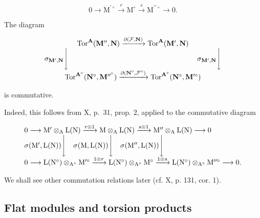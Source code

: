 \[
0 \rightarrow \mathrm{M} ^ {\prime \circ} \xrightarrow {r} \mathrm{M} ^ {\circ} \xrightarrow {s} \mathrm{M} ^ {\prime \prime \circ} \rightarrow 0.
\]

The diagram

\[
\begin{array}{c} \operatorname{Tor} ^ {\mathbf {A}} (\mathbf {M} ^ {\prime \prime}, \mathbf {N}) \xrightarrow {\partial (\mathcal {F} , \mathbf {N})} \operatorname{Tor} ^ {\mathbf {A}} (\mathbf {M} ^ {\prime}, \mathbf {N}) \\ \sigma_ {\mathbf {M} ^ {\prime}, \mathbf {N}} \Biggl \downarrow \qquad \qquad \qquad \qquad \qquad \qquad \qquad \qquad \qquad \sigma_ {\mathbf {M} ^ {\prime}, \mathbf {N}} \Biggl \downarrow \\ \operatorname{Tor} ^ {\mathbf {A} ^ {\circ}} (\mathbf {N} ^ {\circ}, \mathbf {M} ^ {\prime \prime^ {\circ}}) \xrightarrow {\partial (\mathbf {N} ^ {\circ} , \mathcal {F} ^ {\circ})} \operatorname{Tor} ^ {\mathbf {A} ^ {\circ}} (\mathbf {N} ^ {\circ}, \mathbf {M} ^ {\prime \circ}) \end{array}
\]

is commutative.

Indeed, this follows from X, p.~31, prop. 2, applied to the commutative diagram

\[
\begin{array}{l} 0 \longrightarrow \mathrm{M} ^ {\prime} \otimes_ {\mathrm{A}} \mathrm{L} (\mathrm{N}) \xrightarrow {r \otimes 1} \mathrm{M} \otimes_ {\mathrm{A}} \mathrm{L} (\mathrm{N}) \xrightarrow {s \otimes 1} \mathrm{M} ^ {\prime \prime} \otimes_ {\mathrm{A}} \mathrm{L} (\mathrm{N}) \longrightarrow 0 \\ \sigma (\mathrm{M} ^ {\prime}, \mathrm{L} (\mathrm{N})) \Biggl \downarrow \quad \sigma (\mathrm{M}, \mathrm{L} (\mathrm{N})) \Biggl \downarrow \quad \sigma (\mathrm{M} ^ {\prime \prime}, \mathrm{L} (\mathrm{N})) \Biggl \downarrow \\ 0 \longrightarrow \mathrm{L} (\mathrm{N} ^ {\circ}) \otimes_ {\mathrm{A} ^ {\circ}} \mathrm{M} ^ {\prime \circ} \xrightarrow {1 \otimes r} \mathrm{L} (\mathrm{N} ^ {\circ}) \otimes_ {\mathrm{A} ^ {\circ}} \mathrm{M} ^ {\circ} \xrightarrow {1 \otimes s} \mathrm{L} (\mathrm{N} ^ {\circ}) \otimes_ {\mathrm{A} ^ {\circ}} \mathrm{M} ^ {\prime \prime \circ} \longrightarrow 0. \end{array}
\]

We shall see other commutation relations later (cf. X, p. 131, cor. 1).

\subsection{Flat modules and torsion products}

